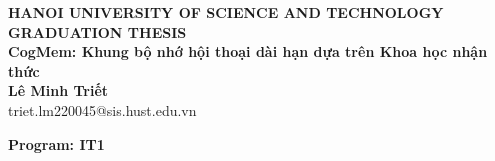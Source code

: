\documentclass[Main.tex]{subfiles}
\begin{document}
\begin{titlepage}
\thispagestyle{empty}
\begin{center}

{\textbf{\large{HANOI UNIVERSITY OF SCIENCE AND TECHNOLOGY }}}\\[4cm]

{\textbf{\huge{GRADUATION THESIS}}}\\[1cm]
{\textbf{\Large{CogMem: Khung bộ nhớ hội thoại dài hạn dựa trên Khoa học nhận thức}}}\\[0.5cm]

{\textbf{\large{Lê Minh Triết}}}\\
{\large{triet.lm220045@sis.hust.edu.vn}}\\[0.5cm]

{\textbf{\large{Program: IT1}}\\[0.5cm]

\vspace{4cm}
\begin{table}[H]
\centering
{}
\end{table}}
\end{center}

\end{titlepage}
\end{document}
